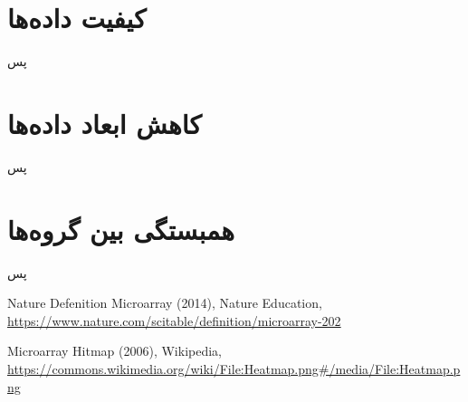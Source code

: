 \documentclass{article}
\begin{document}
\section{کیفیت داده‌ها}
پس

\section{کاهش ابعاد داده‌‌ها}
پس
\section{همبستگی بین گروه‌ها}
پس

\newpage
\begin{thebibliography}{99}
	\begin{latin}
		Nature Defenition Microarray (2014), Nature Education, \url{https://www.nature.com/scitable/definition/microarray-202}
		
		Microarray Hitmap (2006), Wikipedia, \url{https://commons.wikimedia.org/wiki/File:Heatmap.png#/media/File:Heatmap.png}
		
	\end{latin}
\end{thebibliography}
\end{document}
